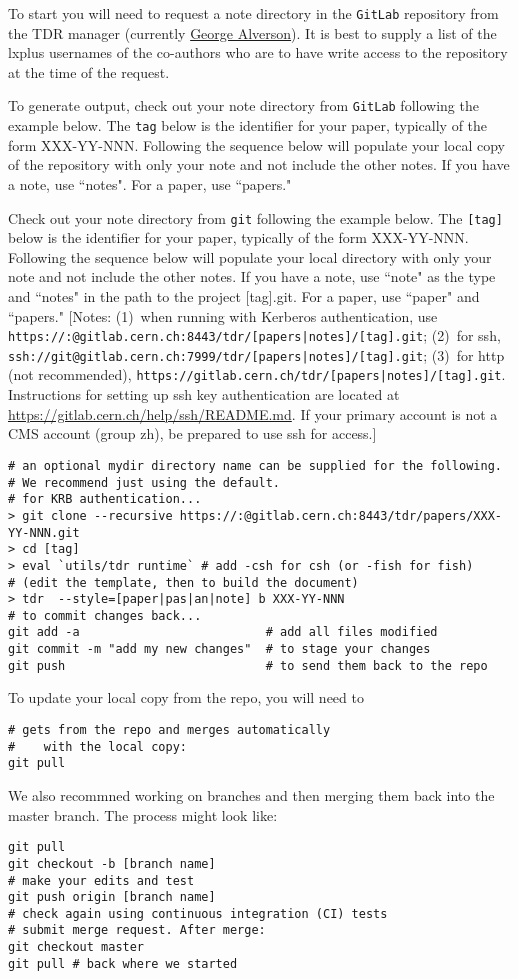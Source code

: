 To start
you will need to request a note directory in the \texttt{GitLab} repository from the TDR manager (currently \href{mailto:George.Alverson@cern.ch}{George Alverson}). It is best to supply a list of the lxplus usernames of the co-authors who are to have write access to the repository at the time of the request.

To generate output, check out your note
directory from \texttt{GitLab} following the example below. The \texttt{tag} below is the identifier for your paper, typically of the form XXX-YY-NNN.
Following the sequence below will populate your local copy of the repository  with only your note and not include the other notes. If you have a note, use ``notes".
For a paper, use ``papers."

Check out your note
directory from \texttt{git} following the example below. The \texttt{[tag]} below is the identifier for your paper, typically of the form XXX-YY-NNN.
Following the sequence below will populate your local directory  with only your note and not include the other notes. If you have a note, use ``note" as the type and ``notes" in the path to the project [tag].git.
For a paper, use ``paper" and ``papers." [Notes: (1)~when running with Kerberos authentication, use \texttt{https://:@gitlab.cern.ch:8443/tdr/[papers|notes]/[tag].git}; (2)~for ssh, \texttt{ssh://git@gitlab.cern.ch:7999/tdr/[papers|notes]/[tag].git}; (3)~for http (not recommended), \texttt{https://gitlab.cern.ch/tdr/[papers|notes]/[tag].git}. Instructions for setting up ssh key authentication are located at \url{https://gitlab.cern.ch/help/ssh/README.md}. If your primary account is not a CMS account (group zh), be prepared to use ssh for access.]
\begin{verbatim}
# an optional mydir directory name can be supplied for the following.
# We recommend just using the default.
# for KRB authentication...
> git clone --recursive https://:@gitlab.cern.ch:8443/tdr/papers/XXX-YY-NNN.git
> cd [tag]
> eval `utils/tdr runtime` # add -csh for csh (or -fish for fish)
# (edit the template, then to build the document)
> tdr  --style=[paper|pas|an|note] b XXX-YY-NNN
# to commit changes back...
git add -a                          # add all files modified
git commit -m "add my new changes"  # to stage your changes
git push                            # to send them back to the repo
\end{verbatim}


To update your local copy from the repo, you will need to
\begin{verbatim}
# gets from the repo and merges automatically
#    with the local copy:
git pull
\end{verbatim}
We also recommned working on branches and then merging them back into the master branch. The process might look like:
\begin{verbatim}
git pull
git checkout -b [branch name]
# make your edits and test
git push origin [branch name]
# check again using continuous integration (CI) tests
# submit merge request. After merge:
git checkout master
git pull # back where we started
\end{verbatim}
